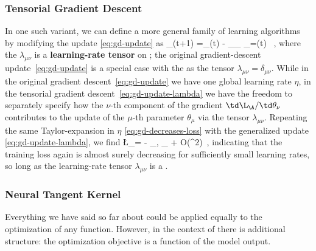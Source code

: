 \subsubsection{Tensorial Gradient Descent}
In one such variant, we can define a more general family of learning algorithms by modifying the update \eqref{eq:gd-update} as 
\be\label{eq:gd-update-lambda}
\theta_\mu(t+1) =\theta_\mu(t) - \eta \sum_{\nu}\lambda_{\mu\nu} \frac{\td \L_\A}{\td \theta_\nu}\Bigg\vert_{\theta=\theta(t)} \, ,
\ee
where the  $\lambda_{\mu\nu}$ is a \textbf{learning-rate tensor} on ; the original gradient-descent update~\eqref{eq:gd-update} is a special case with the  as the tensor $\lambda_{\mu\nu}=\delta_{\mu\nu}$. While in  the original gradient descent~\eqref{eq:gd-update} we have one global learning rate $\eta$, in the tensorial gradient descent~\eqref{eq:gd-update-lambda}  we have the freedom to separately specify how the $\nu$-th component of the gradient $\td \L_{\A} / \td \theta_\nu$ 
contributes to the update of the $\mu$-th parameter $\theta_\mu$ via the  tensor $\lambda_{\mu\nu}$.
Repeating the same Taylor-expansion in $\eta$ \eqref{eq:gd-decreases-loss} with the generalized update \eqref{eq:gd-update-lambda}, we find
\be\label{eq:change-in-loss-lambda}
 \Delta\L_\A = - \eta \sum_{\mu,\nu} \lambda_{\mu\nu}  \frac{\td \L_\A}{\td \theta_\mu} \frac{\td  \L_\A}{\td \theta_\nu}  + O(\eta^2)\, ,
\ee
indicating that the training loss again is almost surely decreasing for sufficiently small learning rates, so long as the learning-rate tensor $\lambda_{\mu\nu}$ is a . 













\subsubsection{Neural Tangent Kernel}\label{sec:nth}
Everything we have said so far about  could be applied equally to the optimization of any
function.
However, in the context of 
there is additional structure: the optimization objective is a function of the model output.

